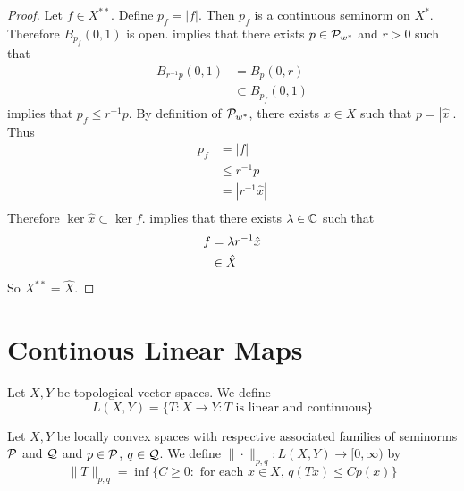 \documentclass{book}
\begin{document}
	\begin{proof}
		Let $f \in X^{**}$. Define $p_{f} = |f|$. Then $p_f$ is a continuous seminorm on $X^*$. Therefore $B_{p_f}(0,1)$ is open.  implies that there exists $p \in \mathcal{P}_{w^*}$ and $r >0$ such that 
		\begin{align*}
			B_{r^{-1}p}(0,1)
			& = B_{p}(0,r) \\
			& \subset B_{p_f}(0,1)
		\end{align*}
		 implies that $p_f \leq r^{-1}p$. By definition of $\mathcal{P}_{w^*}$, there exists $x \in X$ such that $p = |\hat{x}|$. Thus
		\begin{align*}
			p_f
			& = |f| \\
			& \leq r^{-1}p \\
			& = |r^{-1}\hat{x}| \\
		\end{align*} 
	Therefore $\ker \hat{x} \subset \ker f$.  implies that there exists $\lambda \in \mathbb{C}$ such that 
	\begin{align*}
		f 
		& = \lambda r^{-1}\hat{x} \\
		& \in \hat{X}
	\end{align*}
	So $X^{**} = \hat{X}$.
	\end{proof}




























\newpage
\section{Continous Linear Maps}

\begin{defn}
	Let $X,Y$ be topological vector spaces. We define 
	$$L(X,Y) = \{T:X \rightarrow Y: T \text{ is linear and continuous}\}$$
\end{defn}

\begin{defn}
	Let $X, Y$ be locally convex spaces with respective associated families of seminorms $\mathcal{P}$ and $\mathcal{Q}$ and $p \in \mathcal{P}$, $q \in \mathcal{Q}$. We define $\|\cdot\|_{p,q}: L(X, Y) \rightarrow [0, \infty)$ by 
	$$\|T\|_{p,q} = \inf \{C \geq 0: \text{ for each $x \in X$, $q(Tx) \leq Cp(x)$} \}$$
\end{defn}
\end{document}
